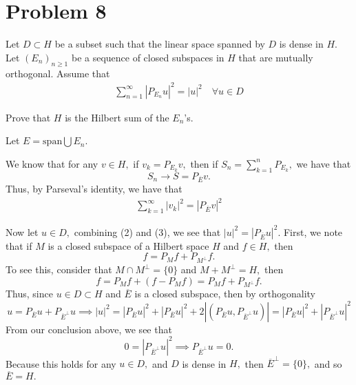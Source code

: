 \documentclass[11pt]{article}
\begin{document}
\section*{Problem 8}
\begin{problem}
    Let \( D \subset H \) be a subset such that the linear space spanned by \( D \) is dense in \( H \). 
Let \( (E_n)_{n \geq 1} \) be a sequence of closed subspaces in \( H \) that are mutually orthogonal. 
Assume that 
\begin{align}
\sum_{n=1}^{\infty} |P_{E_n} u|^2 = |u|^2 \quad \forall u \in D    
\end{align}
 
Prove that \( H \) is the Hilbert sum of the \( E_n \)'s.

\end{problem}
\begin{solution}
    Let $E = \text{span}\bigcup E_n.$
    
    We know that for any $v\in H,$ if $v_k = P_{E_k}v,$ then if $S_n = \sum_{k=1}^n P_{E_k},$ we have that 
    \[S_n \to S = P_{\overline{E}}v.\] Thus, by Parseval's identity, we have that
    \begin{align}
    \sum_{k=1}^\infty |v_k|^2= |P_{\overline{E}}v|^2
    \end{align}
    
    Now let $u \in D,$ combining (2) and (3), we see that $|u|^2 = |P_{\overline{E}}u|^2.$ First, we note that if $M$ is a closed subspace of a Hilbert space $H$ and $f \in H,$ then
    \[f = P_Mf + P_{M^\perp}f.\] To see this, consider that $M \cap M^\perp = \{0\}$ and $M + M^\perp = H,$ then 
    \[f = P_Mf + (f - P_Mf) = P_Mf + P_{M^\perp}f.\] Thus, since $u\in D\subset H$ and $\overline{E}$ is a closed subspace, then by orthogonality
    \[u = P_{\overline{E}}u + P_{\overline{E}^\perp}u \implies |u|^2 = |P_{\overline{E}}u|^2 + |P_{\overline{E}}u|^2 + 2|(P_{\overline{E}}u, P_{\overline{E}^\perp} u)| = |P_{\overline{E}}u|^2 + |P_{\overline{E}^\perp}u|^2\] From our conclusion above, we see that 
    \[0 = |P_{\overline{E}^\perp}u|^2 \implies P_{\overline{E}^\perp}u = 0.\] Because this holds for any $u \in D,$ and $D$ is dense in $H,$ then $\overline{E}^\perp = \{0\},$ and so $\overline{E} = H.$
\end{solution}


\newpage
\end{document}
